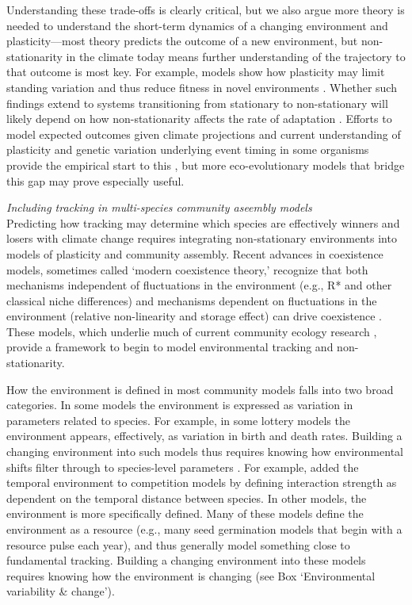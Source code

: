 \documentclass[11pt,letterpaper]{article}
\begin{document}
Understanding these trade-offs is clearly critical, but we also argue more theory is needed to understand the short-term dynamics of a changing environment and plasticity---most theory predicts the outcome of a new environment, but non-stationarity in the climate today means further understanding of the trajectory to that outcome is most key. For example, models show how plasticity may limit standing variation and thus reduce fitness in novel environments \citep{Ghalambor2007,fox2019}. Whether such findings extend to systems transitioning from stationary to non-stationary will likely depend on how non-stationarity affects the rate of adaptation \citep{chevin2010}. Efforts to model expected outcomes given climate projections and current understanding of plasticity and genetic variation underlying event timing in some organisms provide the empirical start to this \citep[e.g.,][]{fournier2016}, but more eco-evolutionary models that bridge this gap may prove especially useful. 

\emph{Including tracking in multi-species community aseembly models} \\
Predicting how tracking may determine which species are effectively winners and losers with climate change requires integrating non-stationary environments into models of plasticity and community assembly. Recent advances in coexistence models, sometimes called `modern coexistence theory,' recognize that both mechanisms independent of fluctuations in the environment (e.g., R* and other classical niche differences) and mechanisms dependent on fluctuations in the environment (relative non-linearity and storage effect) can drive coexistence \citep{Chesson:1997dz,Chesson:2000vd}. These models, which underlie much of current community ecology research \citep{Mayfield:2010fe,barabas2018,ellner2019}, provide a framework to begin to model environmental tracking and non-stationarity. 

How the environment is defined in most community models falls into two broad categories. In some models the environment is expressed as variation in parameters related to species. For example, in some lottery models the environment appears, effectively, as variation in birth and death rates. Building a changing environment into such models thus requires knowing how environmental shifts filter through to species-level parameters \citep{Tuljapurkar2009}. For example, \citet{volkerass} added the temporal environment to competition models by defining interaction strength as dependent on the temporal distance between species. In other models, the environment is more specifically defined. Many of these models define the environment as a resource (e.g., many seed germination models that begin with a resource pulse each year), and thus generally model something close to fundamental tracking. Building a changing environment into these models requires knowing how the environment is changing (see Box `Environmental variability \& change').
\end{document}
